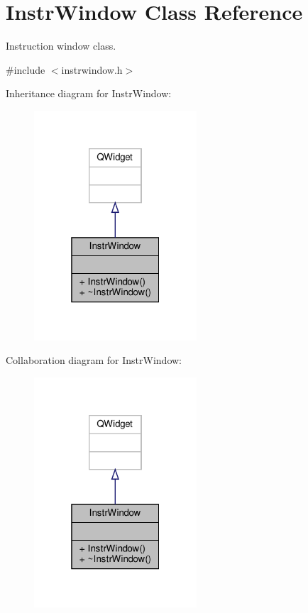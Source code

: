 \hypertarget{classInstrWindow}{}\section{Instr\+Window Class Reference}
\label{classInstrWindow}


Instruction window class.  




{\ttfamily \#include $<$instrwindow.\+h$>$}



Inheritance diagram for Instr\+Window\+:\nopagebreak
\begin{figure}[H]
\begin{center}
\leavevmode
\includegraphics[width=172pt]{classInstrWindow__inherit__graph}
\end{center}
\end{figure}


Collaboration diagram for Instr\+Window\+:\nopagebreak
\begin{figure}[H]
\begin{center}
\leavevmode
\includegraphics[width=172pt]{classInstrWindow__coll__graph}
\end{center}
\end{figure}
